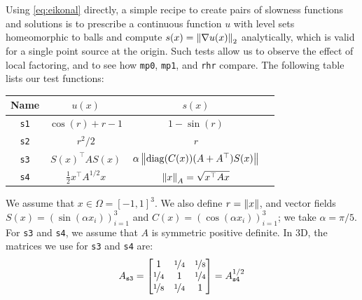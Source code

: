 \documentclass{article}
\begin{document}
Using \cref{eq:eikonal} directly, a simple recipe to create pairs of
slowness functions and solutions is to prescribe a continuous function
$u$ with level sets homeomorphic to balls and compute
$s(x) = \left\|\nabla u(x)\right\|_2$ analytically, which is valid for a
single point source at the origin. Such tests allow us to observe the
effect of local factoring, and to see how \texttt{mp0}, \texttt{mp1},
and \texttt{rhr} compare. The following table lists our test
functions: \vspace{0.5em}
\begin{center}
  \begin{tabular}{cccc}
    Name & $u(x)$ & $s(x)$ \\
    \midrule
    \texttt{s1} & $\cos(r) + r - 1$ & $1 - \sin(r)$ \\
    \texttt{s2} & $r^2/2$ & $r$ \\
    \texttt{s3} & $S(x)^\top A S(x)$ & $\alpha\left\|\operatorname{diag}(C(x)){(A + A^\top)}S(x)\right\|$ \\
    \texttt{s4} & $\tfrac{1}{2} x^\top A^{1/2} x$ & $\left\|x\right\|_A = \sqrt{x^\top A x}$
  \end{tabular}
\end{center}
\vspace{0.5em} We assume that $x \in \Omega = [-1, 1]^3$. We also
define $r = \left\|x\right\|$, and vector fields
$S(x) = (\sin(\alpha x_i))_{i=1}^3$ and
$C(x) = (\cos(\alpha x_i))_{i=1}^3$; we take $\alpha = \pi/5$. For
\texttt{s3} and \texttt{s4}, we assume that $A$ is symmetric positive
definite. In 3D, the matrices we use for \texttt{s3} and \texttt{s4}
are:\begin{equation} A_{\texttt{s3}} = \begin{bmatrix}
    1 & \nicefrac{1}{4} & \nicefrac{1}{8} \\
    \nicefrac{1}{4} & 1 & \nicefrac{1}{4} \\
    \nicefrac{1}{8} & \nicefrac{1}{4} & 1
  \end{bmatrix} = A_{\texttt{s4}}^{1/2}
\end{equation}
\end{document}
